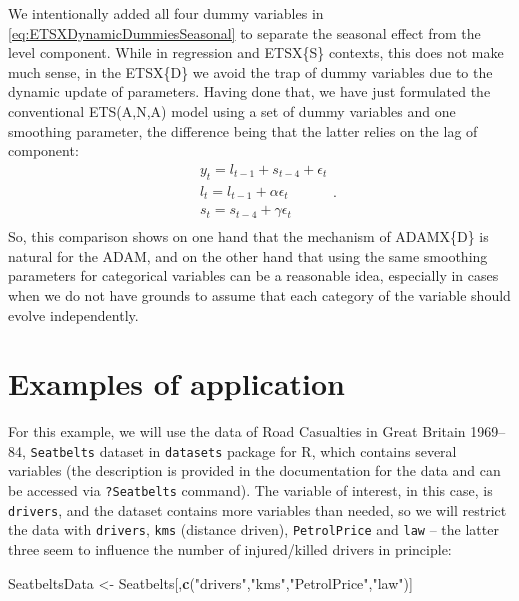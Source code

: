 \documentclass[]{book}
\newenvironment{Shaded}{\begin{snugshade}}{\end{snugshade}}
\newcommand{\KeywordTok}[1]{\textcolor[rgb]{0.13,0.29,0.53}{\textbf{#1}}}
\newcommand{\NormalTok}[1]{#1}
\newcommand{\StringTok}[1]{\textcolor[rgb]{0.31,0.60,0.02}{#1}}
\theoremstyle{definition}
\theoremstyle{definition}
\theoremstyle{definition}
\theoremstyle{definition}
\theoremstyle{remark}
\begin{document}
We intentionally added all four dummy variables in \eqref{eq:ETSXDynamicDummiesSeasonal} to separate the seasonal effect from the level component. While in regression and ETSX\{S\} contexts, this does not make much sense, in the ETSX\{D\} we avoid the trap of dummy variables due to the dynamic update of parameters. Having done that, we have just formulated the conventional ETS(A,N,A) model using a set of dummy variables and one smoothing parameter, the difference being that the latter relies on the lag of component:
\begin{equation}
  \begin{aligned}
    & y_{t} = l_{t-1} + s_{t-4} + \epsilon_t \\
    & l_t = l_{t-1} + \alpha \epsilon_t \\
    & s_t = s_{t-4} + \gamma \epsilon_t \\
  \end{aligned} .
  \label{eq:ADAMETSANAQuarterly}
\end{equation}
So, this comparison shows on one hand that the mechanism of ADAMX\{D\} is natural for the ADAM, and on the other hand that using the same smoothing parameters for categorical variables can be a reasonable idea, especially in cases when we do not have grounds to assume that each category of the variable should evolve independently.

\hypertarget{ETSXRExample}{%
\section{Examples of application}\label{ETSXRExample}}

For this example, we will use the data of Road Casualties in Great Britain 1969--84, \texttt{Seatbelts} dataset in \texttt{datasets} package for R, which contains several variables (the description is provided in the documentation for the data and can be accessed via \texttt{?Seatbelts} command). The variable of interest, in this case, is \texttt{drivers}, and the dataset contains more variables than needed, so we will restrict the data with \texttt{drivers}, \texttt{kms} (distance driven), \texttt{PetrolPrice} and \texttt{law} -- the latter three seem to influence the number of injured/killed drivers in principle:

\begin{Shaded}
\begin{Highlighting}[]
\NormalTok{SeatbeltsData <-}\StringTok{ }\NormalTok{Seatbelts[,}\KeywordTok{c}\NormalTok{(}\StringTok{"drivers"}\NormalTok{,}\StringTok{"kms"}\NormalTok{,}\StringTok{"PetrolPrice"}\NormalTok{,}\StringTok{"law"}\NormalTok{)]}
\end{Highlighting}
\end{Shaded}
\end{document}
